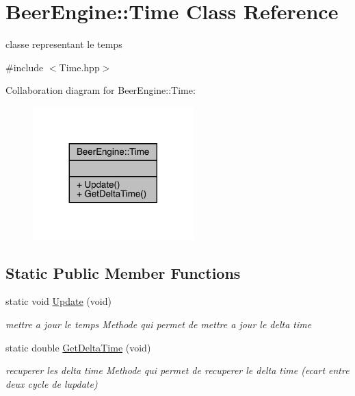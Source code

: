 \hypertarget{class_beer_engine_1_1_time}{}\section{Beer\+Engine\+:\+:Time Class Reference}
\label{class_beer_engine_1_1_time}


classe representant le temps  




{\ttfamily \#include $<$Time.\+hpp$>$}



Collaboration diagram for Beer\+Engine\+:\+:Time\+:\nopagebreak
\begin{figure}[H]
\begin{center}
\leavevmode
\includegraphics[width=176pt]{class_beer_engine_1_1_time__coll__graph}
\end{center}
\end{figure}
\subsection*{Static Public Member Functions}
\begin{DoxyCompactItemize}
\item 
static void \mbox{\hyperlink{class_beer_engine_1_1_time_abc2653b297b763e819ac708600cccf95}{Update}} (void)
\begin{DoxyCompactList}\small\item\em mettre a jour le temps Methode qui permet de mettre a jour le delta time \end{DoxyCompactList}\item 
static double \mbox{\hyperlink{class_beer_engine_1_1_time_a0ade54bfb934ff9e3771912b3408e594}{Get\+Delta\+Time}} (void)
\begin{DoxyCompactList}\small\item\em recuperer les delta time Methode qui permet de recuperer le delta time (ecart entre deux cycle de l\textquotesingle{}update) \end{DoxyCompactList}\end{DoxyCompactItemize}


